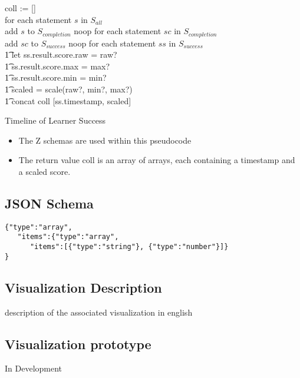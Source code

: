 \documentclass{article}
\begin{document}
  \begin{algorithm}[H]
    \SetAlgoLined
    coll := [] \\
     {
      for each statement $s$ in $S_{all}$ \\
      {
        add $s$ to $S_{completion}$
      }
      {
        noop
      }}
     {
      for each statement $sc$ in $S_{completion}$ \\
      {
        add $sc$ to $S_{success}$
      }
      {
        noop
      }}
     {
      for each statement $ss$ in $S_{success}$ \\
      \t1 let ss.result.score.raw = raw? \\ \t1 \:\:\:\:\:
          ss.result.score.max = max? \\ \t1 \:\:\:\:\:
          ss.result.score.min = min? \\ \t1 \:\:\:\:\:
          scaled = scale(raw?, min?, max?) \\
       \t1 concat coll [ss.timestamp, scaled]
    }
    \caption{Timeline of Learner Success}
  \end{algorithm}
  \begin{itemize}
    \item The Z schemas are used within this pseudocode
    \item The return value coll is an array of arrays, each containing a
      timestamp and a scaled score.
  \end{itemize}

  \subsection{JSON Schema}
\begin{lstlisting}[style=json]
{"type":"array",
   "items":{"type":"array",
      "items":[{"type":"string"}, {"type":"number"}]}
}
\end{lstlisting}

  \subsection{Visualization Description}

  description of the associated visualization in english
  \subsection{Visualization prototype}
  In Development
\end{document}
